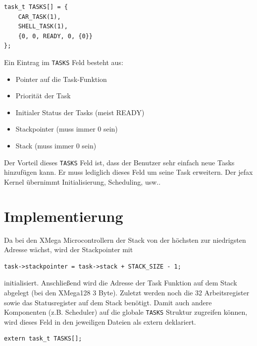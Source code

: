 \documentclass[fontsize=12pt, toc=bibliography, notitlepage]{scrreprt}
\begin{document}
\begin{lstlisting}[title=jefax.c]
task_t TASKS[] = {
    CAR_TASK(1),
    SHELL_TASK(1),
    {0, 0, READY, 0, {0}}
};
\end{lstlisting}

Ein Eintrag im \lstinline$TASKS$ Feld besteht aus:

\begin{itemize}
\item Pointer auf die Task-Funktion
\item Priorität der Task
\item Initialer Status der Tasks (meist READY)
\item Stackpointer (muss immer 0 sein)
\item Stack (muss immer {0} sein)
\end{itemize}

Der Vorteil dieses \lstinline$TASKS$ Feld ist, dass der Benutzer sehr einfach neue Tasks hinzufügen kann. Er muss lediglich dieses Feld um seine Task erweitern. Der jefax Kernel übernimmt Initialisierung, Scheduling, usw..

\section{Implementierung}
\label{subsec:tasks-impl}
Da bei den XMega Microcontrollern der Stack von der höchsten zur niedrigsten Adresse wächst, wird der Stackpointer mit

\begin{lstlisting}
task->stackpointer = task->stack + STACK_SIZE - 1;
\end{lstlisting}

initialisiert. Anschließend wird die Adresse der Task Funktion auf dem Stack abgelegt (bei den XMega128 3 Byte). Zuletzt werden noch die 32 Arbeitsregister sowie das Statusregister auf dem Stack benötigt. Damit auch andere Komponenten (z.B. Scheduler) auf die globale \lstinline$TASKS$ Struktur zugreifen können, wird dieses Feld in den jeweiligen Dateien als extern deklariert.

\begin{lstlisting}
extern task_t TASKS[];
\end{lstlisting}
\end{document}
